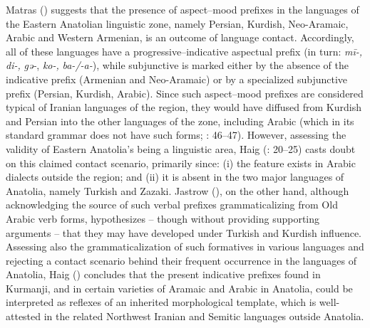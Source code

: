 \documentclass[output=paper]{langsci/langscibook}
\begin{document}
Matras (\citeyear[75]{Matras2010}) suggests that the presence of aspect--mood prefixes in the languages of the Eastern Anatolian linguistic zone, namely Persian, Kurdish, Neo-Aramaic, Arabic and Western Armenian, is an outcome of language contact. Accordingly, all of these languages have a progressive–indicative aspectual prefix (in turn: \textit{mī-,} \textit{di-,} \textit{gǝ-}, \textit{ko-,} \textit{ba-/-a-}), while subjunctive is marked either by the absence of the indicative prefix (Armenian and Neo-Aramaic) or by a specialized subjunctive prefix (Persian, Kurdish, Arabic). Since such aspect--mood prefixes are considered typical of Iranian languages of the region, they would have diffused from Kurdish and Persian into the other languages of the zone, including Arabic (which in its standard grammar does not have such forms; \citealt{Ryding2014}: 46–47). However, assessing the validity of Eastern Anatolia’s being a linguistic area, Haig (\citeyear{HaigÖpengin2014}: 20–25) casts doubt on this claimed contact scenario, primarily since: (i) the feature exists in Arabic dialects outside the region; and (ii) it is absent in the two major languages of Anatolia, namely Turkish and Zazaki. Jastrow (\citeyear[92]{Jastrow2011Kurdish}), on the other hand, although acknowledging the source of such verbal prefixes grammaticalizing from Old Arabic verb forms, hypothesizes – though without providing supporting arguments – that they may have developed under Turkish and Kurdish influence. Assessing also the grammaticalization of such formatives in various languages and rejecting a contact scenario behind their frequent occurrence in the languages of Anatolia, Haig (\citeyear[26]{Haig2014}) concludes that the present indicative prefixes found in Kurmanji, and in certain varieties of Aramaic and Arabic in Anatolia, could be interpreted as reflexes of an inherited morphological template, which is well-attested in the related Northwest Iranian and Semitic languages outside Anatolia.
\end{document}
